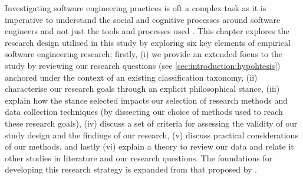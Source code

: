 \label{sec:research-strategy:preface}

Investigating software engineering practices is oft a complex task as it is imperative to understand the social and cognitive processes around software engineers and not just the tools and processes used \citep{Easterbrook:2007ws}. This chapter explores the research design utilised in this study by exploring six key elements of empirical software engineering research: firstly, (i) we provide an extended focus to the study by reviewing our research questions (see \cref{sec:introduction:hypohtesis}) anchored under the context of an existing classification taxonomy, (ii) characterise our research goals through an explicit philosophical stance, (iii) explain how the stance selected impacts our selection of research methods and data collection techniques (by dissecting our choice of methods used to reach these research goals), (iv) discuss a set of criteria for assessing the validity of our study design and the findings of our research, (v) discuss practical considerations of our methods, and lastly (vi) explain a theory to review our data and relate it other studies in literature and our research questions. The foundations for developing this research strategy is expanded from that proposed by \citet{Easterbrook:2007ws}.